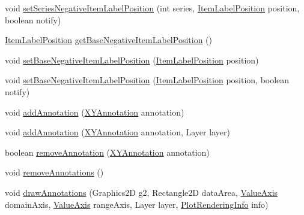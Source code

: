 \begin{DoxyCompactItemize}
\item 
void \mbox{\hyperlink{interfaceorg_1_1jfree_1_1chart_1_1renderer_1_1xy_1_1_x_y_item_renderer_a204bb9dc5545332797be185e858bafdc}{set\+Series\+Negative\+Item\+Label\+Position}} (int series, \mbox{\hyperlink{classorg_1_1jfree_1_1chart_1_1labels_1_1_item_label_position}{Item\+Label\+Position}} position, boolean notify)
\item 
\mbox{\hyperlink{classorg_1_1jfree_1_1chart_1_1labels_1_1_item_label_position}{Item\+Label\+Position}} \mbox{\hyperlink{interfaceorg_1_1jfree_1_1chart_1_1renderer_1_1xy_1_1_x_y_item_renderer_aad96a9a12582675875421455a6177239}{get\+Base\+Negative\+Item\+Label\+Position}} ()
\item 
void \mbox{\hyperlink{interfaceorg_1_1jfree_1_1chart_1_1renderer_1_1xy_1_1_x_y_item_renderer_ac8e02ba738601c4f11c19e075e202578}{set\+Base\+Negative\+Item\+Label\+Position}} (\mbox{\hyperlink{classorg_1_1jfree_1_1chart_1_1labels_1_1_item_label_position}{Item\+Label\+Position}} position)
\item 
void \mbox{\hyperlink{interfaceorg_1_1jfree_1_1chart_1_1renderer_1_1xy_1_1_x_y_item_renderer_a60bff88961023cbd3745c117bbd0066f}{set\+Base\+Negative\+Item\+Label\+Position}} (\mbox{\hyperlink{classorg_1_1jfree_1_1chart_1_1labels_1_1_item_label_position}{Item\+Label\+Position}} position, boolean notify)
\item 
void \mbox{\hyperlink{interfaceorg_1_1jfree_1_1chart_1_1renderer_1_1xy_1_1_x_y_item_renderer_a77ae0c811fd22ffd2f808332deadfcbd}{add\+Annotation}} (\mbox{\hyperlink{interfaceorg_1_1jfree_1_1chart_1_1annotations_1_1_x_y_annotation}{X\+Y\+Annotation}} annotation)
\item 
void \mbox{\hyperlink{interfaceorg_1_1jfree_1_1chart_1_1renderer_1_1xy_1_1_x_y_item_renderer_a3d2e2daa0ed45459a0059b02cdf009b3}{add\+Annotation}} (\mbox{\hyperlink{interfaceorg_1_1jfree_1_1chart_1_1annotations_1_1_x_y_annotation}{X\+Y\+Annotation}} annotation, Layer layer)
\item 
boolean \mbox{\hyperlink{interfaceorg_1_1jfree_1_1chart_1_1renderer_1_1xy_1_1_x_y_item_renderer_ac6ef484d5287771573064a5a76673d92}{remove\+Annotation}} (\mbox{\hyperlink{interfaceorg_1_1jfree_1_1chart_1_1annotations_1_1_x_y_annotation}{X\+Y\+Annotation}} annotation)
\item 
void \mbox{\hyperlink{interfaceorg_1_1jfree_1_1chart_1_1renderer_1_1xy_1_1_x_y_item_renderer_a7144ca499540dcd5bc199cb2de85cc74}{remove\+Annotations}} ()
\item 
void \mbox{\hyperlink{interfaceorg_1_1jfree_1_1chart_1_1renderer_1_1xy_1_1_x_y_item_renderer_ad211e137e4a6a549fdd7715a563aae7c}{draw\+Annotations}} (Graphics2D g2, Rectangle2D data\+Area, \mbox{\hyperlink{classorg_1_1jfree_1_1chart_1_1axis_1_1_value_axis}{Value\+Axis}} domain\+Axis, \mbox{\hyperlink{classorg_1_1jfree_1_1chart_1_1axis_1_1_value_axis}{Value\+Axis}} range\+Axis, Layer layer, \mbox{\hyperlink{classorg_1_1jfree_1_1chart_1_1plot_1_1_plot_rendering_info}{Plot\+Rendering\+Info}} info)

\end{DoxyCompactItemize}
